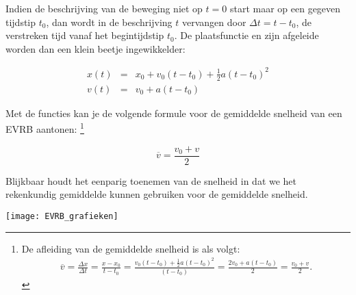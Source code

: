 \documentclass{ximera}
\begin{document}
Indien de beschrijving van de beweging niet op $t=0$ start maar op een gegeven tijdstip $t_0$, dan wordt in de beschrijving $t$ vervangen door $\Delta t= t-t_0$, de verstreken tijd vanaf het begintijdstip $t_0$. De plaatsfunctie en zijn afgeleide worden dan een klein beetje ingewikkelder:

\[
\begin{array}{rcl}
x(t)&=&x_0+v_0(t-t_0)+\frac{1}{2}a(t-t_0)^2\\
v(t)&=&v_0+a(t-t_0)
\end{array}
\]

Met de functies kan je de volgende formule voor de gemiddelde snelheid van een EVRB aantonen:%
\footnote{De afleiding van de gemiddelde snelheid is als volgt:
\begin{eqnarray*}
\overline{v}=\frac{\Delta x}{\Delta t}=\frac{x-x_0}{t-t_0}=\frac{v_0(t-t_0)+\frac{1}{2}a(t-t_0)^2}{(t-t_0)}=\frac{2v_0+a(t-t_0)}{2}=\frac{v_0+v}{2}.
\end{eqnarray*}}

\[
\overline{v}=\frac{v_0+v}{2}
\]

Blijkbaar houdt het eenparig toenemen van de snelheid in dat we het rekenkundig gemiddelde kunnen gebruiken voor de gemiddelde snelheid.




\begin{image}

\texttt{[image: EVRB\_grafieken]}
\end{image}
\end{document}
